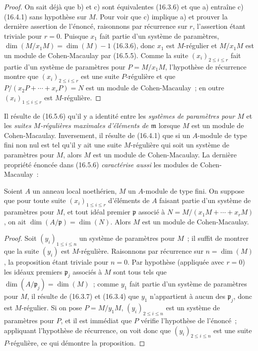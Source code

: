 \begin{proof}
On sait déjà que b) et c) sont équivalentes (16.3.6) et que a) entraîne c)
(16.4.1) sans hypothèse sur $M$. Pour voir que c) implique a) et prouver la
dernière assertion de l'énoncé, raisonnons par récurrence sur $r$, l'assertion
étant triviale pour $r=0$. Puisque $x_1$ fait partie d'un système de
paramètres, $\dim(M/x_1M)=\dim(M)-1$ (16.3.6), donc $x_1$ est $M$-régulier et
$M/x_1M$ est un module de Cohen-Macaulay par (16.5.5). Comme la suite
$(x_i)_{2\leq i\leq r}$ fait partie d'un système de paramètres pour
$P=M/x_1M$, l'hypothèse de récurrence montre que $(x_i)_{2\leq i\leq r}$ est
une suite $P$-régulière et que
$P/(x_2P+\cdots+x_rP)=N$ est un module de Cohen-Macaulay~; en outre
$(x_i)_{1\leq i\leq r}$ est $M$-régulière.
\end{proof}

\begin{remark}[16.5.7]
\label{0.16.5.7-fr}
Il résulte de (16.5.6) qu'il y a identité entre les \emph{systèmes de
paramètres pour $M$} et les \emph{suites $M$-régulières maximales d'éléments de
$\mathfrak{m}$} lorsque $M$ est un module de Cohen-Macaulay. Inversement, il
résulte de (16.4.1) que si un $A$-module de type fini non nul est tel qu'il y
ait une suite $M$-régulière qui soit un système de paramètres pour $M$, alors
$M$ est un module de Cohen-Macaulay. La dernière propriété énoncée dans
(16.5.6) \emph{caractérise aussi} les modules de Cohen-Macaulay~:
\end{remark}

\begin{proposition}[16.5.8]
\label{0.16.5.8-fr}
Soient $A$ un anneau local noethérien, $M$ un $A$-module de type fini. On
suppose que pour toute suite $(x_i)_{1\leq i\leq r}$ d'éléments de $A$
faisant partie d'un système de paramètres pour $M$, et tout idéal premier
$\mathfrak{p}$ associé à
$N=M/(x_1M+\cdots+x_rM)$, on ait
$\dim(A/\mathfrak{p})=\dim(N)$. Alors $M$ est un module de Cohen-Macaulay.
\end{proposition}

\begin{proof}
Soit $(y_i)_{1\leq i\leq n}$ un système de paramètres pour $M$~; il suffit de
montrer que la suite $(y_i)$ est $M$-régulière. Raisonnons par récurrence sur
$n=\dim(M)$, la proposition étant triviale pour $n=0$. Par hypothèse
(appliquée avec $r=0$) les idéaux premiers $\mathfrak{p}_j$ associés à $M$
sont tous tels que $\dim(A/\mathfrak{p}_j)=\dim(M)$~; comme $y_1$ fait partie
d'un système de paramètres
pour $M$, il résulte de (16.3.7) et (16.3.4) que $y_1$ n'appartient à aucun
des $\mathfrak{p}_j$, donc est $M$-régulier. Si on pose $P=M/y_1M$,
$(y_i)_{2\leq i\leq n}$ est un système de paramètres pour $P$, et il est
immédiat que $P$ vérifie l'hypothèse de l'énoncé~; appliquant l'hypothèse de
récurrence, on voit donc que $(y_i)_{2\leq i\leq n}$ est une suite
$P$-régulière, ce qui démontre la proposition.
\end{proof}

